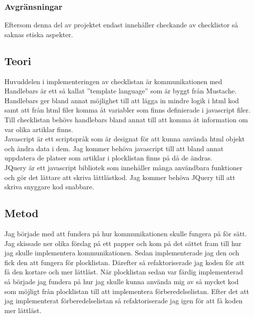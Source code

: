 \subsubsection{Avgränsningar}
Eftersom denna del av projektet endast innehåller checkande av checklistor så saknas etiska aspekter.

\pagebreak
\subsection{Teori}
Huvuddelen i implementeringen av checklistan är kommunikationen med  \cite{socketBook} \\

Handlebars är ett så kallat ''template language'' som är byggt från Mustache. Handlebars ger bland annat möjlighet till att lägga in mindre logik i html kod samt att från html filer komma åt variabler som finns definierade i javascript filer.\cite{handlebars} Till checklistan behövs handlebars bland annat till att komma åt information om var olika artiklar finns. \\

Javascript är ett scriptspråk som är designat för att kunna använda html objekt och ändra data i dem. \cite{javascript} Jag kommer behöva javascript till att bland annat uppdatera de platser som artiklar i plocklistan finns på då de ändras. \\

JQuery är ett javascript bibliotek som innehåller många användbara funktioner och gör det lättare att skriva lättlästkod. \cite{jquery} Jag kommer behöva JQuery till att skriva snyggare kod snabbare.

\pagebreak
 
\subsection{Metod}
Jag började med att fundera på hur kommunikationen skulle fungera på för sätt. Jag skissade ner olika förslag på ett papper och kom på det sättet fram till hur jag skulle implementera kommunikationen. Sedan implementerade jag den och fick den att fungera för plocklistan. Därefter så refaktoriserade jag koden för att få den kortare och mer lättläst. När plocklistan sedan var färdig implementerad så började jag fundera på hur jag skulle kunna använda mig av så mycket kod som möjligt från plocklistan till att implementera förberedelselistan. Efter det att jag implementerat förberedelselistan så refaktoriserade jag igen för att få koden mer lättläst.

